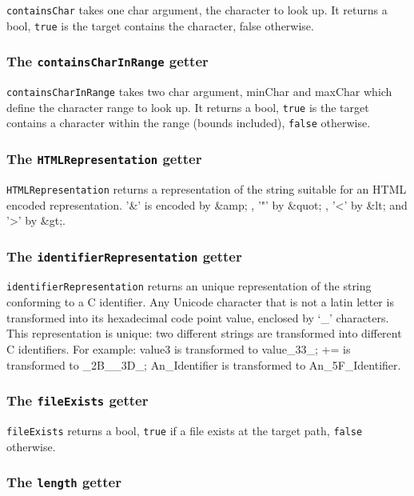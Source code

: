 \documentclass[10pt,openright,twosides,final]{memoir}
\newcommand{\character}[1]{{\small\ttfamily `{#1}'}}
\newcommand{\cdata}[1]{{\ttfamily #1}}
\newcommand{\ccst}[1]{{\footnotesize\ttfamily\colorbox{light-blue}{'#1'}}}
\newcommand{\gtlarg}[1]{{\footnotesize\ttfamily\colorbox{light-blue}{#1}}}
\newcommand{\gtlinline}[1]{\colorbox{light-blue}{\lstinline[language=gtl]{#1}}}
\begin{document}
\gtlinline{containsChar} takes one char argument, the \gtlarg{character} to look up. It returns a bool, \gtlinline{true} is the target contains the \gtlarg{character}, \gtlarg{false} otherwise.

\subsubsection{The \texttt{containsCharInRange} getter}

\gtlinline{containsCharInRange} takes two char argument, \gtlarg{minChar} and \gtlarg{maxChar} which define the character range to look up. It returns a bool, \texttt{true} is the target contains a character within the range (bounds included), \texttt{false} otherwise.

\subsubsection{The \texttt{HTMLRepresentation} getter}

\gtlinline{HTMLRepresentation} returns a representation of the string suitable for an HTML encoded representation. \ccst{\&} is encoded by \cdata{\&amp;} , \ccst{"} by \cdata{\&quot;} , \ccst{<} by \cdata{\&lt;} and \ccst{>} by \cdata{\&gt;}.


\subsubsection{The \texttt{identifierRepresentation} getter}

\gtlinline{identifierRepresentation} returns an unique representation of the string conforming to a C identifier. Any Unicode character that is not a latin letter is transformed into its hexadecimal code point value, enclosed by \character{_} characters. This representation is unique: two different strings are transformed into different C identifiers. For example: \cdata{value3} is transformed to \cdata{value_33_}; \cdata{+=} is transformed to \cdata{_2B__3D_};
\cdata{An_Identifier} is transformed to \cdata{An_5F_Identifier}.


\subsubsection{The \texttt{fileExists} getter}

\gtlinline{fileExists} returns a bool, \gtlinline{true} if a file exists at the target path, \gtlinline{false} otherwise.


\subsubsection{The \texttt{length} getter}
\end{document}
